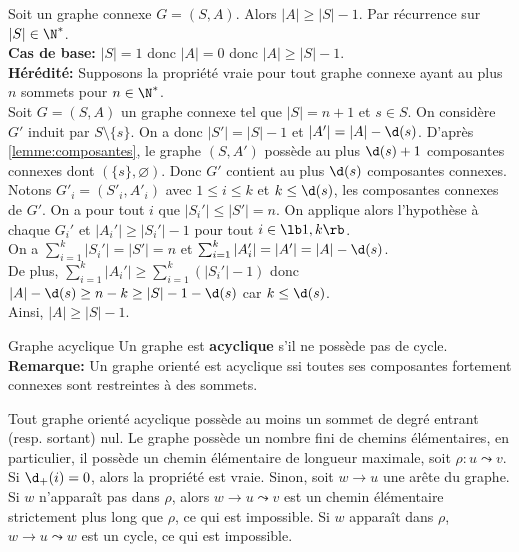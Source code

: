 \documentclass[french, 11pt]{article}
\begin{document}
\begin{prop}{}{}
    Soit un graphe connexe $G=(S,A)$. Alors $|A| \geq |S|-1$.
    \tcblower
    Par récurrence sur $|S|\in\N^*$.\\
    \textbf{Cas de base:} $|S|=1$ donc $|A|=0$ donc $|A|\geq|S|-1$.\\
    \textbf{Hérédité:} Supposons la propriété vraie pour tout graphe connexe ayant au plus $n$ sommets pour $n\in\N^*$.\\
    Soit $G=(S,A)$ un graphe connexe tel que $|S|=n+1$ et $s\in S$. On considère $G'$ induit par $S\setminus\{s\}$. On a donc $|S'|=|S|-1$ et $|A'|=|A|-\d(s)$. D'après \ref{lemme:composantes}, le graphe $(S,A')$ possède au plus $\d(s)+1$ composantes connexes dont $(\{s\}, \varnothing)$. Donc $G'$ contient au plus $\d(s)$ composantes connexes. Notons $G'_i=(S'_i,A'_i)$ avec $1\leq i \leq k$ et $k\leq \d(s)$, les composantes connexes de $G'$. On a pour tout $i$ que $|S_i'|\leq|S'|=n$. On applique alors l'hypothèse à chaque $G_i'$ et $|A_i'|\geq|S_i'|-1$ pour tout $i\in\lb1,k\rb$.\\
    On a $\sum_{i=1}^k|S_i'|=|S'|=n$ et $\sum_{i=1}^k|A_i'|=|A'|=|A|-\d(s)$.\\
    De plus, $\sum_{i=1}^k|A_i'|\geq\sum_{i=1}^k(|S_i'|-1)$ donc $|A|-\d(s)\geq n-k\geq|S|-1-\d(s)$ car $k\leq\d(s)$.\\
    Ainsi, $|A|\geq|S|-1$.
\end{prop}

\begin{defi}{Graphe acyclique}{}
    Un graphe est \textbf{acyclique} s'il ne possède pas de cycle.\\
    \textbf{Remarque:} Un graphe orienté est acyclique ssi toutes ses composantes fortement connexes sont restreintes à des sommets.
\end{defi}

\begin{prop}{}{}
    Tout graphe orienté acyclique possède au moins un sommet de degré entrant (resp. sortant) nul.
    \tcblower
    Le graphe possède un nombre fini de chemins élémentaires, en particulier, il possède un chemin élémentaire de longueur maximale, soit $\rho:u\leadsto v$. Si $\d_+(i)=0$, alors la propriété est vraie. Sinon, soit $w\to u$ une arête du graphe. Si $w$ n'apparaît pas dans $\rho$, alors $w\to u \leadsto v$ est un chemin élémentaire strictement plus long que $\rho$, ce qui est impossible. Si $w$ apparaît dans $\rho$, $w\to u \leadsto w$ est un cycle, ce qui est impossible.
\end{prop}
\end{document}
